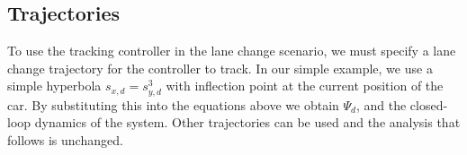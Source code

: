 \subsection{Trajectories}
To use the tracking controller in the lane change scenario, we must specify a lane change trajectory for the controller to track.
In our simple example, we use a simple hyperbola $s_{x,d} = s_{y,d}^3$ with inflection point at the current position of the car.
By substituting this into the equations above we obtain $\Psi_d$, and the closed-loop dynamics of the system. 
Other trajectories can be used and the analysis that follows is unchanged.
%
%
